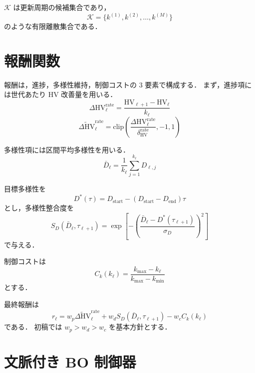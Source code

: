 \documentclass[a4paper,11pt]{ltjsarticle}
\newcommand{\clip}{\mathrm{clip}}
\newcommand{\HV}{\mathrm{HV}}
\begin{document}
\(\mathcal{K}\) は更新周期の候補集合であり，
\begin{equation}
\mathcal{K}=\{k^{(1)},k^{(2)},\dots,k^{(M)}\}
\end{equation}
のような有限離散集合である．

\section{報酬関数}

報酬は，進捗，多様性維持，制御コストの 3 要素で構成する．
まず，進捗項には世代あたり HV 改善量を用いる．
\begin{equation}
\Delta \HV^{\mathrm{rate}}_\ell
=
\frac{\HV_{\ell+1}-\HV_\ell}{k_\ell}
\end{equation}
\begin{equation}
\widetilde{\Delta \HV}^{\mathrm{rate}}_\ell
=
\clip
\left(
\frac{\Delta \HV^{\mathrm{rate}}_\ell}
{\delta_{\HV}^{\mathrm{rate}}},
-1,1
\right)
\end{equation}

多様性項には区間平均多様性を用いる．
\begin{equation}
\bar{D}_\ell
=
\frac{1}{k_\ell}
\sum_{j=1}^{k_\ell}
D_{\ell,j}
\end{equation}

目標多様性を
\begin{equation}
D^\ast(\tau)
=
D_{\mathrm{start}}
-
(D_{\mathrm{start}}-D_{\mathrm{end}})\tau
\end{equation}
とし，多様性整合度を
\begin{equation}
S_D(\bar{D}_\ell,\tau_{\ell+1})
=
\exp
\left[
-
\left(
\frac{\bar{D}_\ell-D^\ast(\tau_{\ell+1})}
{\sigma_D}
\right)^2
\right]
\end{equation}
で与える．

制御コストは
\begin{equation}
C_k(k_\ell)
=
\frac{k_{\max}-k_\ell}{k_{\max}-k_{\min}}
\end{equation}
とする．

最終報酬は
\begin{equation}
r_\ell
=
w_p
\widetilde{\Delta \HV}^{\mathrm{rate}}_\ell
+
w_d
S_D(\bar{D}_\ell,\tau_{\ell+1})
-
w_c
C_k(k_\ell)
\end{equation}
である．
初稿では \(w_p>w_d>w_c\) を基本方針とする．

\section{文脈付き BO 制御器}
\end{document}
